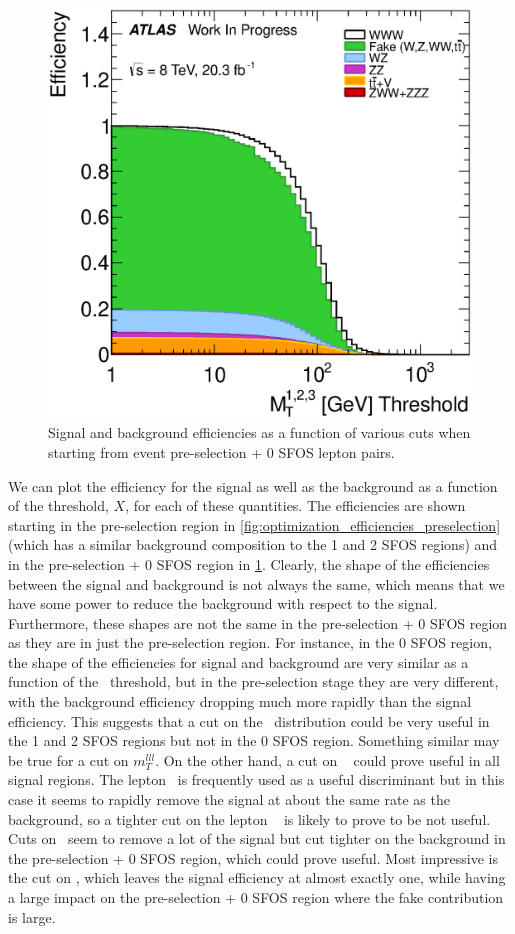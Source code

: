 \begin{figure}[ht!]
\includegraphics[width=0.3\columnwidth]{figures/optimization/SignalRegionsPreselection_0SFOS_Efficiencies/ThreeLeptonMt_Cumulative.eps}
\caption{Signal and background efficiencies as a function of various cuts when starting from event pre-selection + 0 SFOS lepton pairs.}
\label{fig:optimization_efficiencies_0sfos}
\end{figure}

We can plot the efficiency for the signal as well as the background
as a function of the threshold, $X$, for each of these quantities. 
The efficiencies are shown starting 
in the pre-selection region in 
\fig\ref{fig:optimization_efficiencies_preselection} 
(which has a similar background composition to the 1 and 2 SFOS regions)
and in the pre-selection + 0 SFOS region
in \fig\ref{fig:optimization_efficiencies_0sfos}.
Clearly, the shape of the efficiencies between the signal and
background is not always the same, which means that we have some
power to reduce the background with respect to the signal.
Furthermore, these shapes are not the same in the pre-selection 
+ 0 SFOS region as they are in just the pre-selection region.
For instance, in the 0 SFOS region, the shape of the efficiencies
for signal and background are very similar as a function
of the \MET~threshold, but in the pre-selection stage they are
very different, with the background efficiency dropping much
more rapidly than the signal efficiency. This suggests that
a cut on the \MET~distribution could be very useful 
in the 1 and 2 SFOS regions but not in the 0 SFOS region.
Something similar may be true for a cut on $m_{T}^{lll}$.
On the other hand, a cut on \deltaphi~ could prove useful in all 
signal regions. The lepton \pt~is frequently used as a useful discriminant
but in this case it seems to rapidly remove the signal at about the
same rate as the background, so a tighter cut on the lepton \pt~
is likely to prove to be not useful. Cuts on \njet~seem to remove a lot of 
the signal but cut tighter on the background in the pre-selection
+ 0 SFOS region, which could prove useful.  Most impressive is 
the cut on \nbjet, which leaves the signal efficiency at almost exactly
one, while having a large impact on the pre-selection + 0 SFOS region
where the fake contribution is large.

